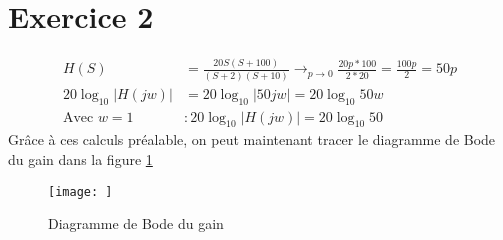 \documentclass{article}
\theoremstyle{plain}%
\theoremstyle{definition}
\theoremstyle{remark}
\begin{document}
\section{Exercice 2}
\begin{align*}
    H(S) &= \frac{20S(S+100)}{(S+2)(S+10)} \to _{p \to 0} \frac{20p*100}{2*20} = \frac{100p}{2} = 50p \\
    20 \log_{10} \left| H(jw) \right|  &= 20 \log_{10} \left| 50jw \right| = 20 \log_{10} 50w \\
    \text{Avec } w = 1 &: 20 \log_{10} \left| H(jw) \right| = 20 \log_{10} 50
\end{align*}
Grâce à ces calculs préalable, on peut maintenant tracer le diagramme de Bode du gain dans la figure \ref*{BodeGain}
\begin{figure}[htbp]
    \centering
    \texttt{[image: ]}
    \caption{Diagramme de Bode du gain}
    \label{BodeGain}
\end{figure}
\end{document}
